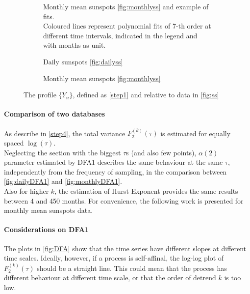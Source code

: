 \begin{figure}[!h]
	\centering
	\begin{subfigure}{\textwidth}
		\centering
		
		\caption{Monthly mean sunspots \ref{fig:monthlyss} and example of fits. \\ 
		Coloured lines represent polynomial fits of 7-th order at different time intervals, indicated in the legend and with months as unit.}\label{fig:profilemain}
	\end{subfigure}
	\vfill
	\begin{subfigure}{0.48\textwidth}
		\centering
		
		\caption{Daily sunspots \ref{fig:dailyss}}\label{fig:dailyprofile}
	\end{subfigure}
	\hfill
	\begin{subfigure}{0.48\textwidth}
		
		\caption{Monthly mean sunspots \ref{fig:monthlyss}}\label{fig:monthlyprofile}
	\end{subfigure}
	\caption{The profile $\{Y_n\}$, defined as \autoref{step1} and relative to data in \autoref{fig:ss}}\label{fig:profile}
\end{figure}

\paragraph{Comparison of two databases}
As describe in \autoref{step4}, the total variance $F_2^{( k )}(\tau)$ is estimated for equally spaced $\log(\tau)$.\\
Neglecting the section with the biggest $\tau$s (and also few points), $\alpha(2)$ parameter estimated by DFA1 describes the same behaviour at the same $\tau$, independently from the frequency of sampling, in the comparison between \autoref{fig:dailyDFA1} and \autoref{fig:monthlyDFA1}.\\
Also for higher $k$, the estimation of Hurst Exponent provides the same results between 4 and 450 months. For convenience, the following work is presented for monthly mean sunspots data. 

\paragraph{Considerations on DFA1}
The plots in \autoref{fig:DFA} show that the time series have different slopes at different time scales. Ideally, however, if a process is self-affinal, the log-log plot of $F_2^{( k )}(\tau)$ should be a straight line. This could mean that the process has different behaviour at different time scale, or that the order of detrend $k$ is too low.

